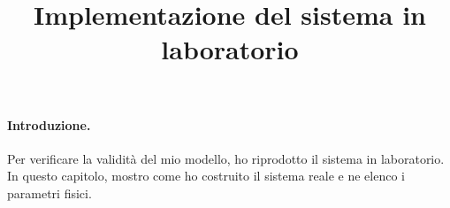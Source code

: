 \title{Implementazione del sistema in laboratorio}
\maketitle
\label{sec:pic-irl}

\paragraph{Introduzione.}
Per verificare la validità del mio modello, ho riprodotto il sistema in laboratorio.
In questo capitolo, mostro come ho costruito il sistema reale e ne elenco i parametri
fisici.



